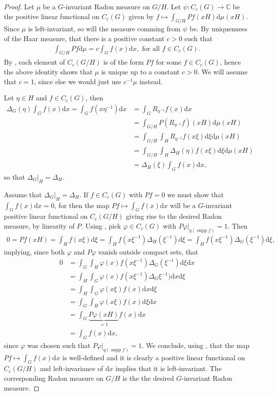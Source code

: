 \documentclass[10pt,twoside,openany,final]{memoir}
\theoremstyle{definition}
\theoremstyle{Break}
\newcommand{\C}{\mathbb{C}}
\DeclareMathOperator{\supp}{supp}
\renewcommand{\d}{\mathrm{d}}
\begin{document}
\begin{proof}
	Let $\mu$ be a $G$-invariant Radon measure on $G/H$. Let $\psi \colon C_c(G) \to \C$ be the positive linear functional on $C_c(G)$ given by $f \mapsto \int_{G/H} Pf(xH) \d \mu(xH)$. Since $\mu$ is left-invariant, so will the measure comming from $\psi$ be. By uniquenuess of the Haar measure, that there is a positive constant $c>0$ such that
	\begin{align*}
		\int_{G/H} Pf \d \mu = c \int_G f(x) \d x, \text{ for all } f \in C_c(G).
	\end{align*}
	By , each element of $C_c(G/H)$ is of the form $Pf$ for some $f \in C_c(G)$,  hence the above identity shows that $\mu$ is unique up to a constant $c >0$. We will assume that $c=1$, since else we would just use $c^{-1}\mu$ instead.

	Let $\eta \in H$ and $f \in C_c(G)$, then
	\begin{align*}
		\Delta_G(\eta) \int_G f(x) \d x = \int_{G} f(x \eta^{-1}) \d x&= \int_G R_{\eta^{-1}}f(x) \d x \\
		&= \int_{G/H}P(R_{\eta^{-1}} f)(xH) \d \mu(xH)\\
		&= \int_{G/H}\int_{H}R_{\eta^{-1}}f(x \xi) \d \xi \d \mu(xH)\\
		&= \int_{G/H} \int_H \Delta_H(\eta) f(x \xi) \d \xi \d \mu(xH)\\
		&= \Delta_H(\xi) \int_G f(x) \d x,
	\end{align*}
	so that $\Delta_G|_H=\Delta_H$.

	Assume that $\Delta_G|_H=\Delta_H$. If $f \in C_c(G)$ with $Pf=0$ we must show that $\int_G f(x) \d x=0$, for then the map $Pf \mapsto \int_G f(x) \d x$ will be a $G$-invariant positive linear functional on $C_c(G/H)$ giving rise to the desired Radon measure, by linearity of $P$.
	Using , pick $\varphi \in C_c(G)$ with $P\varphi|_{q(\supp f)}=1$. Then
	\begin{align*}
		0=Pf(xH)=\int_{H} f(x\xi) \d \xi = \int_{H} f(x \xi^{-1}) \Delta_H(\xi^{-1}) \d \xi = \int_{H} f(x \xi^{-1}) \Delta_G(\xi^{-1}) \d \xi,
	\end{align*}
	implying, since both $\varphi$ and $P\varphi$ vanish outside compact sets, that
	\begin{align*}
		0&= \int_G \int_H \varphi(x) f(x \xi^{-1}) \Delta_G(\xi^{-1}) \d \xi \d x\\
		&=\int_H \int_G \varphi(x) f(x \xi^{-1}) \Delta_G\xi^{-1}) \d x \d \xi\\
		&=\int_H\int_G \varphi(x \xi) f(x) \d x \d \xi\\
		&=\int_G \int_H \varphi(x \xi) f(x) \d \xi \d x\\
		&= \int_G \underbrace{P\varphi(xH)}_{=1} f(x) \d x\\
		&= \int_G f(x) \d x,
	\end{align*}
	since $\varphi$ was chosen such that $P\varphi|_{q(\supp f)}=1$. We conclude, using , that the map $Pf \mapsto \int_G f(x) \d x$ is well-defined and it is clearly a positive linear functional on $C_c(G/H)$ and left-invariance of $\d x$ implies that it is left-invariant. The corresponding Radon measure on $G/H$ is the the desired $G$-invariant Radon measure.
\end{proof}
\end{document}
